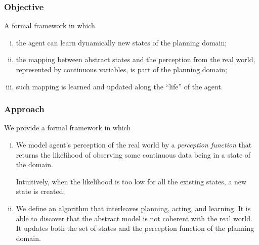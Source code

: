 \documentclass{beamer}
\begin{document}
\begin{frame}
  \frametitle{Objective}
  
A formal framework in which

\begin{enumerate}[(i)]
    \item  the agent can {\color {red} learn dynamically new states} of the planning domain;
    \item the {\color {red} mapping} between abstract {\color {red} states} and the {\color {red} perception} from the real world, represented by {\color {red} continuous variables}, is part of the planning domain; 
    \item
    such {\color {red} mapping is learned} and updated along the “life” of the agent.  
\end{enumerate}

\end{frame}

\begin{frame}

\frametitle{Approach}
 
We provide a formal framework in which
\begin{enumerate}[(i)]
  \item    We model agent's perception of the real world by a
{\color {red} 
 \emph{perception function}} that returns {\color {red} the likelihood of observing some continuous data being in a state} of the domain.

Intuitively, when the likelihood is too low for all
the existing states, a new state is created;
\pause
\item We define an {\color {red} algorithm that interleaves planning, acting, and learning}. 
It is able to discover that the abstract model is not
coherent with the real world.  
It {\color {red} updates} both the set of {\color {red} states} and the {\color {red} perception function} of the
planning domain.
\end{enumerate}  
\end{frame}
\end{document}
